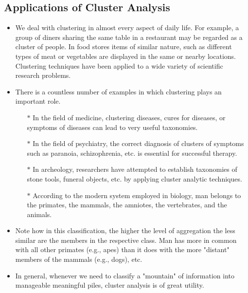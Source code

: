 \subsection{Applications of Cluster Analysis}
\begin{itemize}
\item 	
We deal with clustering in almost every aspect of daily life. For example, a group of diners sharing the same table in a restaurant may be regarded as a cluster of people. In food stores items of similar nature, such as different types of meat or vegetables are displayed in the same or nearby locations. Clustering techniques have been applied to a wide variety of scientific research problems. 

\item There is a countless number of examples in which clustering plays an important role. 
\begin{itemize}
\item[$\ast$] In the field of medicine, clustering diseases, cures for diseases, or symptoms of diseases can lead to very useful taxonomies. 
\item[$\ast$] In the field of psychiatry, the correct diagnosis of clusters of symptoms such as paranoia, schizophrenia, etc. is essential for successful therapy. 
\item[$\ast$] In archeology, researchers have attempted to establish taxonomies of stone tools, funeral objects, etc. by applying cluster analytic techniques. 
\item[$\ast$] According to the modern system employed in biology, man belongs to the primates, the mammals, the amniotes, the vertebrates, and the animals.
\end{itemize}
\item 
Note how in this classification, the higher the level of aggregation the less similar are the members in the respective class. Man has more in common with all other primates (e.g., apes) than it does with the more "distant" members of the mammals (e.g., dogs), etc.
\item 
In general, whenever we need to classify a "mountain" of information into manageable meaningful piles, cluster analysis is of great utility.
\end{itemize}


